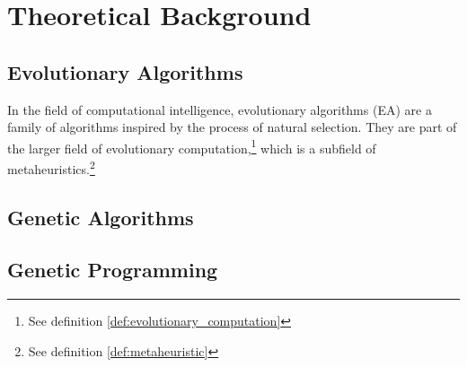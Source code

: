 \chapter{Theoretical Background}
\label{chap:theoretical_background}
  \section{Evolutionary Algorithms}
  \label{sec:evolutionary_algorithms}
    In the field of computational intelligence, evolutionary algorithms (EA)
    \autocite{yuIntroductionEvolutionaryAlgorithms2010} are a family of algorithms inspired by the 
    process of natural selection. 
    They are part of the larger field of evolutionary 
    computation,\footnote{See definition \ref{def:evolutionary_computation}} which is a subfield of 
    metaheuristics.\footnote{See definition \ref{def:metaheuristic}}

    

  \section{Genetic Algorithms}
  \label{sec:genetic_algorithms}
    \Blindtext
  \section{Genetic Programming}
  \label{sec:genetic_programming}
    \Blindtext